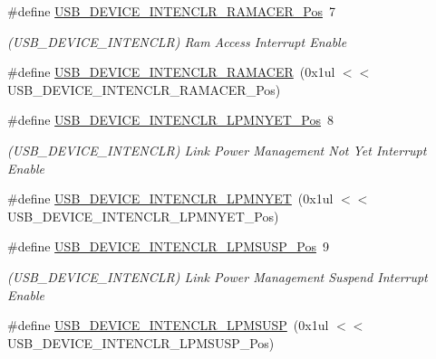 \begin{DoxyCompactItemize}
\item 
\#define \mbox{\hyperlink{group___s_a_m_d21___u_s_b_ga9e66d87d6859bb7a3e1712977aa54df1}{U\+S\+B\+\_\+\+D\+E\+V\+I\+C\+E\+\_\+\+I\+N\+T\+E\+N\+C\+L\+R\+\_\+\+R\+A\+M\+A\+C\+E\+R\+\_\+\+Pos}}~7
\begin{DoxyCompactList}\small\item\em (U\+S\+B\+\_\+\+D\+E\+V\+I\+C\+E\+\_\+\+I\+N\+T\+E\+N\+C\+LR) Ram Access Interrupt Enable \end{DoxyCompactList}\item 
\#define \mbox{\hyperlink{group___s_a_m_d21___u_s_b_ga86b5a35403d7c7a916b345a3f76f5f2f}{U\+S\+B\+\_\+\+D\+E\+V\+I\+C\+E\+\_\+\+I\+N\+T\+E\+N\+C\+L\+R\+\_\+\+R\+A\+M\+A\+C\+ER}}~(0x1ul $<$$<$ U\+S\+B\+\_\+\+D\+E\+V\+I\+C\+E\+\_\+\+I\+N\+T\+E\+N\+C\+L\+R\+\_\+\+R\+A\+M\+A\+C\+E\+R\+\_\+\+Pos)
\item 
\#define \mbox{\hyperlink{group___s_a_m_d21___u_s_b_gaba9233a85f6c1ff252fb8860e0406c66}{U\+S\+B\+\_\+\+D\+E\+V\+I\+C\+E\+\_\+\+I\+N\+T\+E\+N\+C\+L\+R\+\_\+\+L\+P\+M\+N\+Y\+E\+T\+\_\+\+Pos}}~8
\begin{DoxyCompactList}\small\item\em (U\+S\+B\+\_\+\+D\+E\+V\+I\+C\+E\+\_\+\+I\+N\+T\+E\+N\+C\+LR) Link Power Management Not Yet Interrupt Enable \end{DoxyCompactList}\item 
\#define \mbox{\hyperlink{group___s_a_m_d21___u_s_b_ga8fe5f088c564c645eae7f85dfc3b1435}{U\+S\+B\+\_\+\+D\+E\+V\+I\+C\+E\+\_\+\+I\+N\+T\+E\+N\+C\+L\+R\+\_\+\+L\+P\+M\+N\+Y\+ET}}~(0x1ul $<$$<$ U\+S\+B\+\_\+\+D\+E\+V\+I\+C\+E\+\_\+\+I\+N\+T\+E\+N\+C\+L\+R\+\_\+\+L\+P\+M\+N\+Y\+E\+T\+\_\+\+Pos)
\item 
\#define \mbox{\hyperlink{group___s_a_m_d21___u_s_b_ga76ddac563814b550b242b8d1b80e52ae}{U\+S\+B\+\_\+\+D\+E\+V\+I\+C\+E\+\_\+\+I\+N\+T\+E\+N\+C\+L\+R\+\_\+\+L\+P\+M\+S\+U\+S\+P\+\_\+\+Pos}}~9
\begin{DoxyCompactList}\small\item\em (U\+S\+B\+\_\+\+D\+E\+V\+I\+C\+E\+\_\+\+I\+N\+T\+E\+N\+C\+LR) Link Power Management Suspend Interrupt Enable \end{DoxyCompactList}\item 
\#define \mbox{\hyperlink{group___s_a_m_d21___u_s_b_ga82d27acaa4ba337bd8b1b0f1c64fc440}{U\+S\+B\+\_\+\+D\+E\+V\+I\+C\+E\+\_\+\+I\+N\+T\+E\+N\+C\+L\+R\+\_\+\+L\+P\+M\+S\+U\+SP}}~(0x1ul $<$$<$ U\+S\+B\+\_\+\+D\+E\+V\+I\+C\+E\+\_\+\+I\+N\+T\+E\+N\+C\+L\+R\+\_\+\+L\+P\+M\+S\+U\+S\+P\+\_\+\+Pos)
\item 
$$
\end{DoxyCompactItemize}
